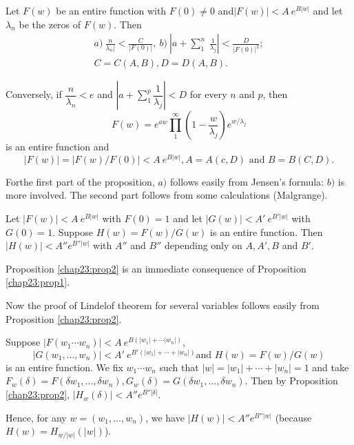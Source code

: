 \begin{proposition}\label{chap23:prop1}%
  Let $F(w)$ be an entire function with $F(0) \neq 0$ and\break $| F (w) | <
  A ~ e^{B|w|}$ and let $\lambda_n$ be the zeros of $F(w)$. Then 
  \begin{gather*}
    a)~ \frac{n}{\lambda_n | }< \frac{C}{|F(0) |}, ~b)~ | a + \sum_1^n ~
    \frac{1}{\lambda_j} | < \frac{D}{|F(0)|^2};\\ 
    C = C(A,B), D = D(A,B).
  \end{gather*}
\end{proposition}

Conversely, if $\dfrac{n}{\lambda_n} < e$ and $| a + \sum\limits_1^p
\dfrac{1}{\lambda_j}| < D$ for every $n$ and $p$, then 
$$
F(w) = e^{aw} \prod_{1}^\infty \left(1- \frac{w}{\lambda_j}\right) e^{w/\lambda_j}
$$
is an entire function and 
$$
| F(w) | = | F(w)/F(0)| < A ~ e^{B|w|}, A = A(c,D) \text{ and } B = B(C,D).
$$

For\pageoriginale the first part of the proposition, $a)$ follows easily from
Jensen's formula: $b)$ is more involved. The second part follows from
some calculations (Malgrange). 

\begin{proposition}\label{chap23:prop2}%
  Let $|F(w)| < A ~ e^{B|w|}$ with $F(0) = 1$ and let $|G(w) | < A' ~
  e^{B'|w|}$ with $G(0) = 1$. Suppose $H(w) = F(w) / G(w)$ is an
  entire function. Then $|H(w) | < A'' e^{B''|w|}$ with $A''$ and $B''$
  depending only on $A, A', B$ and $B'$. 
\end{proposition}

Proposition \ref{chap23:prop2} is an immediate consequence of
Proposition \ref{chap23:prop1}.

Now the proof of Lindelof theorem for several variables follows easily
from Proposition \ref{chap23:prop2}. 

Suppose $|F(w_1 \cdots w_n) | < A ~ e^{B(|w_1|+ \cdots | w_n|)}$,
$$
| G(w_1, \ldots, w_n) | < A' ~ e^{B'(|w_1| + \cdots + |w_n|)} \text{
 and } H(w) = F(w)/G(w) 
$$
is an entire function. We fix $w_1 \cdots w_n$ such that $|w | = |w_1
| + \cdots + | w_n | = 1$ and take $F_w(\delta) = F(\delta w_1,
\ldots, \delta w_n), G_w(\delta) = G(\delta w_1, \ldots, \delta
w_n)$. Then by Proposition \ref{chap23:prop2}, $| H_w (\delta) | < A''
e^{B''|\delta|}$.  

Hence, for any $w = (w_1, \ldots, w_n)$, we have $|H(w)|< A''
e^{B''|w|}$ (because $H(w) = H_{w/|w|}(|w|)$). 
